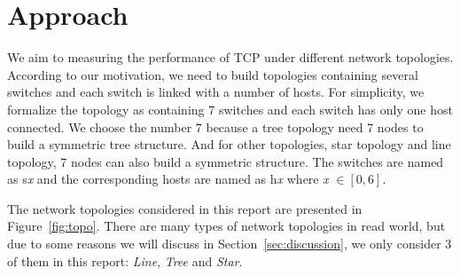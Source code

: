 \section{Approach} \label{sec:approach}

We aim to measuring the performance of TCP under different network topologies.
According to our motivation, we need to build topologies containing several
switches and each switch is linked with a number of hosts. For simplicity,
we formalize the topology as containing 7 switches and each switch has only 
one host connected. We choose the number 7 because a tree topology need 7 nodes
to build a symmetric tree structure. And for other topologies, \eg star topology
and line topology, 7 nodes can also build a symmetric structure. The switches are named
as s{\it x} and the corresponding hosts are named as h{\it x} where {\it x} $\in [0, 6]$.

The network topologies considered in this report are presented in Figure~\ref{fig:topo}.
There are many types of network topologies in read world, but
due to some reasons we will discuss in Section~\ref{sec:discussion}, we only consider
3 of them in this report: {\it Line}, {\it Tree} and {\it Star}. 

